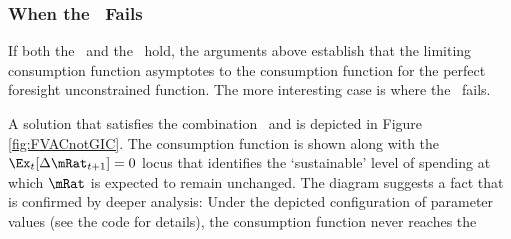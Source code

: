\documentclass[./BufferStockTheory.tex]{subfiles}
\begin{document}
\hypertarget{The-GIC}{}
\hypertarget{When-the-GIC-Fails}{}
\subsubsection{When the \GIC~Fails}

If both the \GIC~and the \RIC~hold, the arguments above establish that the limiting consumption
function asymptotes to the consumption function for the perfect foresight unconstrained function.
The more interesting case is where the \GIC~fails.
\begin{comment}
\WW{}{The same
steps as above lead to the same implication that this requires
$\InvEpShkInv < (\Rfree/\PGro)^{1/\CRRA}\uInvEpShkuInv^{1-1/\CRRA}$,
but when the \RIC~$\Rfree/\PGro > 1$ holds this condition is much more
easily satisfied.}
If the \FVAC~holds but the \GIC~does not, the parameters must satisfy:
\begin{align}
\DiscFac \PGro^{1-\CRRA}\Ex[\pshk^{1-\CRRA}] & < 1 < (\Rfree\DiscFac)^{1/\CRRA}(\PGro\Ex[\pshk^{-1}])^{-1}. \label{eq:FVACnotGIC}
\end{align}

Note first that by Jensens's inequality $\Ex[\pshk^{1-\CRRA}] > 1$ and $(\Ex[\pshk^{-1}])^{-1} < 1$,
so \eqref{eq:FVACnotGIC} is stronger than
\begin{align}
\DiscFac \PGro^{1-\CRRA} & < 1 < (\Rfree\DiscFac)^{1/\CRRA}/\PGro. \label{eq:PFFVACnotPFGIC}
\end{align}


Suppose $\PGro=1$, $\CRRA=2$ and $\pshk$ is lognormally distributed with $\sigma^{2}_{\pshk}=0.01$ (that is, $\log \pshk \sim \mathcal{N}(-\sigma_{\psi}^{2}/2,\sigma_{\psi}^{2})$) so that $\Ex_{t}[\pshk_{t+1}^{1-\CRRA}] =\Ex_{t}[\pshk_{t+1}^{-1}] =\exp(\sigma^{2}_{\psi})=e^{0.01}.$  Then the condition becomes
\begin{align}
\DiscFac e^{0.01} & < 1 < (\Rfree \DiscFac)^{1/2}e^{-0.01}
\end{align}
which can be satisfied, for example, by $\DiscFac = 0.96$ and $\Rfree=1.08$.
\end{comment}
A solution that satisfies the combination \FVAC~and
\cncl{\GIC} is depicted in Figure \ref{fig:FVACnotGIC}.  The
consumption function is shown along with the $\Ex_{t}[\Delta
\mRat_{t+1}]=0$ locus that identifies the `sustainable' level of
spending at which $\mRat$ is expected to remain unchanged.  The
diagram suggests a fact that is confirmed by deeper analysis: Under
the depicted configuration of parameter values (see the code for details), the consumption function never reaches the
\end{document}
